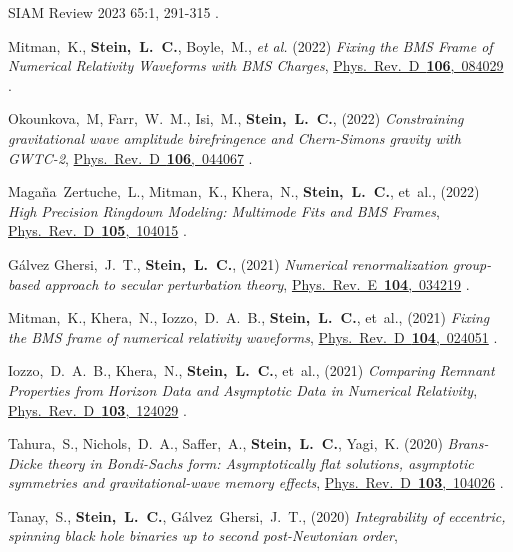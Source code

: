 \begin{etaremune}[start=\value{pubCounter}]
  {SIAM Review 2023 65:1, 291-315}
  .
\item
  Mitman,~K.,
  {\bf Stein,~L.~C.},
  Boyle,~M., {\it et al.}
  (2022)
  {\it Fixing the BMS Frame of Numerical Relativity Waveforms with BMS Charges},
  \href{https://doi.org/10.1103/PhysRevD.106.084029}%
  {Phys.~Rev.~D~{\bf 106},~084029}
  .
\item
  Okounkova,~M,
  Farr,~W.~M.,
  Isi,~M.,
  {\bf Stein,~L.~C.},
  (2022)
  {\it Constraining gravitational wave amplitude birefringence and Chern-Simons gravity with GWTC-2},
  \href{https://doi.org/10.1103/PhysRevD.106.044067}%
  {Phys.~Rev.~D~{\bf 106},~044067}
  .
\item
  Magaña~Zertuche,~L.,
  Mitman,~K.,
  Khera,~N.,
  {\bf Stein,~L.~C.},
  et~al.,
  (2022)
  {\it High Precision Ringdown Modeling: Multimode Fits and BMS Frames},
  \href{https://doi.org/10.1103/PhysRevD.105.104015}%
  {Phys.~Rev.~D~{\bf 105},~104015}
  .
\item
  Gálvez Ghersi,~J.~T.,
  {\bf Stein,~L.~C.},
  (2021)
  {\it Numerical renormalization group-based approach to secular perturbation theory},
  \href{https://doi.org/10.1103/PhysRevE.104.034219}%
  {Phys.~Rev.~E~{\bf 104},~034219}
  .
\item
  Mitman,~K.,
  Khera,~N.,
  Iozzo,~D.~A.~B.,
  {\bf Stein,~L.~C.},
  et~al.,
  (2021)
  {\it Fixing the BMS frame of numerical relativity waveforms},
  \href{https://doi.org/10.1103/PhysRevD.104.024051}%
  {Phys.~Rev.~D~{\bf 104},~024051}
  .
\item
  Iozzo,~D.~A.~B.,
  Khera,~N.,
  {\bf Stein,~L.~C.},
  et~al.,
  (2021)
  {\it Comparing Remnant Properties from Horizon Data and Asymptotic Data in Numerical Relativity},
  \href{https://doi.org/10.1103/PhysRevD.103.124029}%
  {Phys.~Rev.~D~{\bf 103},~124029}
  .
\item
  Tahura,~S.,
  Nichols,~D.~A.,
  Saffer,~A.,
  {\bf Stein,~L.~C.},
  Yagi,~K.
  (2020)
  {\it Brans-Dicke theory in Bondi-Sachs form: Asymptotically flat solutions, asymptotic symmetries and gravitational-wave memory effects},
  \href{https://doi.org/10.1103/PhysRevD.103.104026}%
  {Phys.~Rev.~D~{\bf 103},~104026}
  .
\item
  Tanay,~S.,
  {\bf Stein,~L.~C.},
  Gálvez~Ghersi,~J.~T.,
  (2020)
  {\it Integrability of eccentric, spinning black hole binaries up to second post-Newtonian order},

\end{etaremune}
